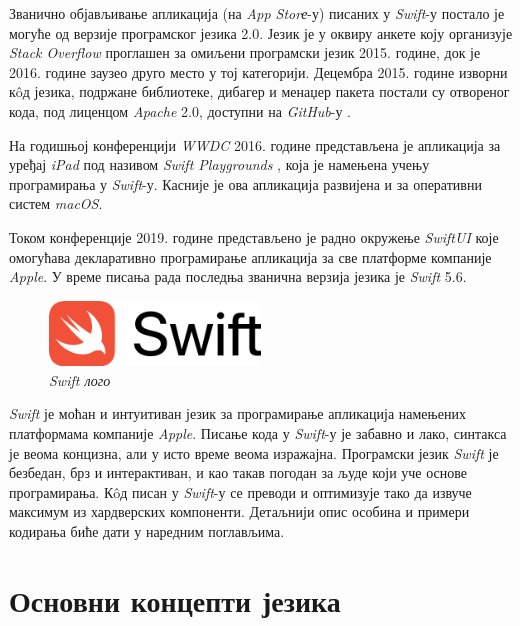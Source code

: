 \documentclass[12pt,oneside]{memoir}
\begin{document}
\indent Званично објављивање апликација (на \textit{App Storе}-у) писаних у \textit{Swift}-у постало је могуће од верзије програмског језика 2.0. Језик је у оквиру анкете коју организује  \textit{Stack Overflow}  \cite{StackOverflow} проглашен за омиљени програмски језик 2015. године, док је 2016. године заузео друго место у тој категорији. Децембра 2015. године изворни к\^{o}д језика, подржане библиотеке, дибагер и менаџер пакета постали су отвореног кода, под лиценцом \textit{Apache} 2.0, доступни на \textit{GitHub}-у \cite{GitHub_Swift}.

\indent На годишњој конференцији \textit{WWDC} 2016. године представљена је апликација за уређај \textit{iPad} под називом \textit{Swift Playgrounds} \cite{Swift_Playground}, која је намењена учењу програмирања у \textit{Swift}-у. Касније је ова апликација развијена и за оперативни систем \textit{macOS}.

\indent Током конференције 2019. године представљено је радно окружење \textit{SwiftUI} \cite{Swift_SwiftUI} које омогућава декларативно програмирање апликација за све платформе компаније \textit{Apple}. У време писања рада последња званична верзија језика је \textit{Swift} 5.6.

\begin{figure}[H]
\includegraphics[width=0.5\textwidth]{images/Swift_logo.png}
\centering
\caption{\textit{Swift лого}}
\label{slika:swift_logo}
\end{figure}

\indent \textit{Swift} је моћан и интуитиван језик за програмирање апликација намењених платформама компаније \textit{Apple}. Писање кода у \textit{Swift}-у је забавно и лако, синтакса је веома концизна, али у исто време веома изражајна. Програмски језик \textit{Swift} је безбедан, брз и интерактиван, и као такав погодан за људе који уче основе програмирања. К\^{o}д писан у \textit{Swift}-у се преводи и оптимизује тако да извуче максимум из хардверских компоненти. Детаљнији опис особина и примери кодирања биће дати у наредним поглављима. 

\section{Основни концепти језика}
\label{sec:Концепти}
\end{document}
